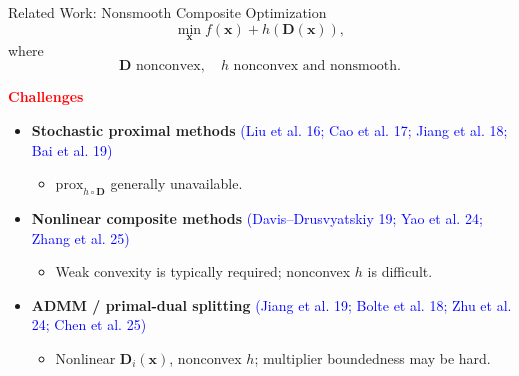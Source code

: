 \documentclass[mathserif,compress,override,9pt]{beamer}
\numberwithin{equation}{section}
\newcommand{\prox}{\mathrm{prox}}
\newcommand{\bx}{\bm{x}}
\newcommand{\bD}{\bm{D}}
\newcommand{\blue}[1]{\textcolor{blue}{#1}}
\newcommand{\red}[1]{\textcolor{red}{#1}}
\theoremstyle{remark}
\begin{document}
\begin{frame}[t]{Related Work: Nonsmooth Composite Optimization}
\small
\vspace{-0.4cm}
\[\min\limits_{\bx} f(\bx)+h(\bD(\bx)), \] where
\[
\bD \text{ nonconvex}, \quad h \text{ nonconvex and nonsmooth}.
\]

\par\vspace{0.1cm}

{\red{\textbf{Challenges}}}
\vspace{-0.08cm}
\begin{itemize}
  \setlength{\itemsep}{0.012cm}
  \item[\blue{$\blacktriangleright$}] {{\textbf{Stochastic proximal methods}}}
  {\footnotesize \blue{(Liu et al. 16; Cao et al. 17; Jiang et al. 18; Bai et al. 19)}}\\[-0.07cm]
  \begin{itemize}
    \setlength{\itemsep}{0pt}
    \item[\blue{$\bullet$}] {\footnotesize {\(\prox_{h\circ \bD}\) generally unavailable.}}
  \end{itemize}

  \item[\blue{$\blacktriangleright$}] {{\textbf{Nonlinear composite methods}}}
  {\footnotesize \blue{(Davis--Drusvyatskiy 19; Yao et al. 24; Zhang et al. 25)}}\\[-0.07cm]
  \begin{itemize}
    \setlength{\itemsep}{0pt}
    \item[\blue{$\bullet$}] {\footnotesize Weak convexity is typically required; nonconvex \(h\) is difficult.}
  \end{itemize}

  \item[\blue{$\blacktriangleright$}] {{\textbf{ADMM / primal-dual splitting}}}
  {\footnotesize \blue{(Jiang et al. 19; Bolte et al. 18; Zhu et al. 24; Chen et al. 25)}}\\[-0.07cm]
  \begin{itemize}
    \setlength{\itemsep}{0pt}
    \item[\blue{$\bullet$}] {\footnotesize {Nonlinear \(\bD_i(\bx)\), nonconvex \(h\); multiplier boundedness may be hard.}}
  \end{itemize}
\end{itemize}


\end{frame}
\end{document}
